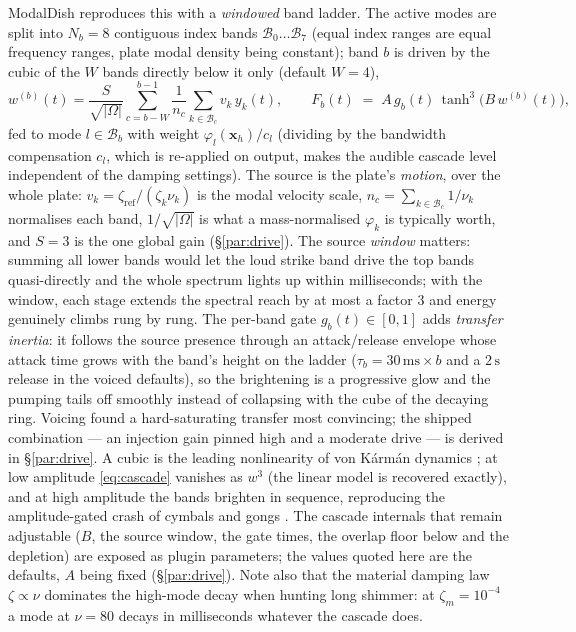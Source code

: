 \documentclass[11pt,a4paper]{article}
\begin{document}
ModalDish reproduces this with a \emph{windowed} band ladder. The active
modes are split into $N_b = 8$ contiguous index bands
$\mathcal{B}_0 \ldots \mathcal{B}_7$ (equal index ranges are equal
frequency ranges, plate modal density being constant); band $b$ is driven
by the cubic of the $W$ bands directly below it only (default $W = 4$),
%
\begin{equation}
  w^{(b)}(t) = \frac{S}{\sqrt{|\Omega|}} \sum_{c = b-W}^{b-1}
              \frac{1}{n_c} \sum_{k \in \mathcal{B}_c} v_k\, y_k(t),
  \qquad
  F_b(t) \;=\; A\, g_b(t)\, \tanh^3\!\bigl(B\, w^{(b)}(t)\bigr),
  \label{eq:cascade}
\end{equation}
%
fed to mode $l \in \mathcal{B}_b$ with weight $\varphi_l(\bm{x}_h)/c_l$
(dividing by the bandwidth compensation $c_l$, which is re-applied on
output, makes the audible cascade level independent of the damping
settings). The source is the plate's \emph{motion}, over the whole plate:
$v_k = \zeta_{\mathrm{ref}}/(\zeta_k \nu_k)$ is the modal velocity scale,
$n_c = \sum_{k \in \mathcal{B}_c} 1/\nu_k$ normalises each band,
$1/\sqrt{|\Omega|}$ is what a mass-normalised $\varphi_k$ is typically
worth, and $S = 3$ is the one global gain (\S\ref{par:drive}). The source \emph{window} matters: summing all lower bands
would let the loud strike band drive the top bands quasi-directly and the
whole spectrum lights up within milliseconds; with the window, each stage
extends the spectral reach by at most a factor 3 and energy genuinely
climbs rung by rung. The per-band gate $g_b(t) \in [0,1]$ adds
\emph{transfer inertia}: it follows the source presence through an
attack/release envelope whose attack time grows with the band's height on
the ladder ($\tau_b = 30\,\mathrm{ms} \times b$ and a $2\,\mathrm{s}$
release in the voiced defaults), so the brightening is a progressive glow
and the pumping tails off smoothly instead of collapsing with the cube of
the decaying ring. Voicing found a hard-saturating transfer most
convincing; the shipped combination --- an injection gain pinned high and a
moderate drive --- is derived in \S\ref{par:drive}. A
cubic is the leading nonlinearity of von K\'arm\'an dynamics
\cite{ducceschi-touze}; at low amplitude \eqref{eq:cascade} vanishes as
$w^3$ (the linear model is recovered exactly), and at high amplitude the
bands brighten in sequence, reproducing the amplitude-gated crash of
cymbals and gongs \cite{fletcher-rossing}. The cascade internals that remain
adjustable ($B$, the source window, the gate times, the overlap floor below
and the depletion) are exposed as plugin parameters; the values quoted here
are the defaults, $A$ being fixed (\S\ref{par:drive}). Note also that the material damping law
$\zeta \propto \nu$ dominates the high-mode decay when hunting long
shimmer: at $\zeta_m = 10^{-4}$ a mode at $\nu = 80$ decays in
milliseconds whatever the cascade does.
\end{document}
